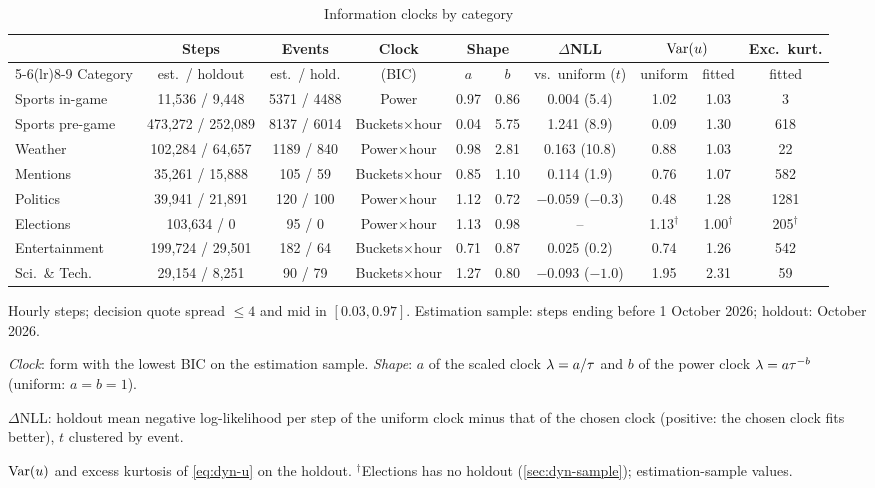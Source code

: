 \begin{table}[t]
\centering
\begin{threeparttable}
\caption{Information clocks by category}\label{tab:dyn-clock}
\scriptsize
\setlength{\tabcolsep}{2.5pt}
\begin{tabular}{lccccccccc}
\toprule
 & Steps & Events & Clock & \multicolumn{2}{c}{Shape} & $\Delta$NLL & \multicolumn{2}{c}{$\operatorname{Var}(u)$} & Exc.\ kurt. \\
\cmidrule(lr){5-6}\cmidrule(lr){8-9}
Category & est.\ / holdout & est.\ / hold. & (BIC) & $a$ & $b$ & vs.\ uniform ($t$) & uniform & fitted & fitted \\
\midrule
Sports in-game & 11{,}536 / 9{,}448 & 5371 / 4488 & Power & 0.97 & 0.86 & 0.004 (5.4) & 1.02 & 1.03 & 3 \\
Sports pre-game & 473{,}272 / 252{,}089 & 8137 / 6014 & Buckets$\times$hour & 0.04 & 5.75 & 1.241 (8.9) & 0.09 & 1.30 & 618 \\
Weather & 102{,}284 / 64{,}657 & 1189 / 840 & Power$\times$hour & 0.98 & 2.81 & 0.163 (10.8) & 0.88 & 1.03 & 22 \\
Mentions & 35{,}261 / 15{,}888 & 105 / 59 & Buckets$\times$hour & 0.85 & 1.10 & 0.114 (1.9) & 0.76 & 1.07 & 582 \\
Politics & 39{,}941 / 21{,}891 & 120 / 100 & Power$\times$hour & 1.12 & 0.72 & $-0.059$ ($-0.3$) & 0.48 & 1.28 & 1281 \\
Elections & 103{,}634 / 0 & 95 / 0 & Power$\times$hour & 1.13 & 0.98 & -- & 1.13$^\dagger$ & 1.00$^\dagger$ & 205$^\dagger$ \\
Entertainment & 199{,}724 / 29{,}501 & 182 / 64 & Buckets$\times$hour & 0.71 & 0.87 & 0.025 (0.2) & 0.74 & 1.26 & 542 \\
Sci.\ \& Tech. & 29{,}154 / 8{,}251 & 90 / 79 & Buckets$\times$hour & 1.27 & 0.80 & $-0.093$ ($-1.0$) & 1.95 & 2.31 & 59 \\
\bottomrule
\end{tabular}
\begin{tablenotes}[flushleft]\footnotesize
\item Hourly steps; decision quote spread $\le4$\cents{} and mid in $[0.03,0.97]$. Estimation sample: steps ending before 1 October 2026; holdout: October 2026.
\item \emph{Clock}: form with the lowest BIC on the estimation sample. \emph{Shape}: $a$ of the scaled clock $\lambda=a/\tau$ and $b$ of the power clock $\lambda=a\tau^{-b}$ (uniform: $a=b=1$).
\item $\Delta$NLL: holdout mean negative log-likelihood per step of the uniform clock minus that of the chosen clock (positive: the chosen clock fits better), $t$ clustered by event.
\item $\operatorname{Var}(u)$ and excess kurtosis of \cref{eq:dyn-u} on the holdout. $^\dagger$Elections has no holdout (\cref{sec:dyn-sample}); estimation-sample values.
\end{tablenotes}
\end{threeparttable}
\end{table}

